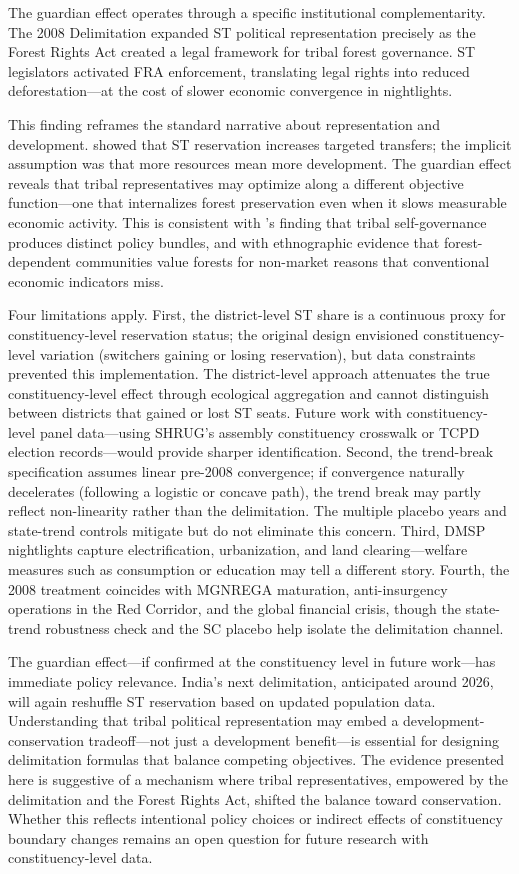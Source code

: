 \documentclass[12pt]{article}
\begin{document}
The guardian effect operates through a specific institutional complementarity. The 2008 Delimitation expanded ST political representation precisely as the Forest Rights Act created a legal framework for tribal forest governance. ST legislators activated FRA enforcement, translating legal rights into reduced deforestation---at the cost of slower economic convergence in nightlights.

This finding reframes the standard narrative about representation and development. \citet{pande2003} showed that ST reservation increases targeted transfers; the implicit assumption was that more resources mean more development. The guardian effect reveals that tribal representatives may optimize along a different objective function---one that internalizes forest preservation even when it slows measurable economic activity. This is consistent with \citet{anderson2011}'s finding that tribal self-governance produces distinct policy bundles, and with ethnographic evidence that forest-dependent communities value forests for non-market reasons that conventional economic indicators miss.

Four limitations apply. First, the district-level ST share is a continuous proxy for constituency-level reservation status; the original design envisioned constituency-level variation (switchers gaining or losing reservation), but data constraints prevented this implementation. The district-level approach attenuates the true constituency-level effect through ecological aggregation and cannot distinguish between districts that gained or lost ST seats. Future work with constituency-level panel data---using SHRUG's assembly constituency crosswalk or TCPD election records---would provide sharper identification. Second, the trend-break specification assumes linear pre-2008 convergence; if convergence naturally decelerates (following a logistic or concave path), the trend break may partly reflect non-linearity rather than the delimitation. The multiple placebo years and state-trend controls mitigate but do not eliminate this concern. Third, DMSP nightlights capture electrification, urbanization, and land clearing---welfare measures such as consumption or education may tell a different story. Fourth, the 2008 treatment coincides with MGNREGA maturation, anti-insurgency operations in the Red Corridor, and the global financial crisis, though the state-trend robustness check and the SC placebo help isolate the delimitation channel.

The guardian effect---if confirmed at the constituency level in future work---has immediate policy relevance. India's next delimitation, anticipated around 2026, will again reshuffle ST reservation based on updated population data. Understanding that tribal political representation may embed a development-conservation tradeoff---not just a development benefit---is essential for designing delimitation formulas that balance competing objectives. The evidence presented here is suggestive of a mechanism where tribal representatives, empowered by the delimitation and the Forest Rights Act, shifted the balance toward conservation. Whether this reflects intentional policy choices or indirect effects of constituency boundary changes remains an open question for future research with constituency-level data.
\end{document}
